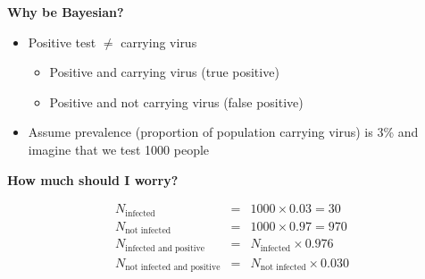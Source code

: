 \documentclass[titlepage,landscape,pdftex]{seminar}
\newcommand{\heading}[1]{{\color{red}\large\bf#1}}
\begin{document}
\begin{slide}
  \heading{Why be Bayesian?}

  \begin{itemize}
    
  \item Positive test $\ne$ carrying virus

    \begin{itemize}

    \item Positive and carrying virus (true positive)

    \item Positive and not carrying virus (false positive)

    \end{itemize}

  \item Assume prevalence (proportion of population carrying virus)
    is 3\% and imagine that we test 1000 people

  \end{itemize}

  \vfill
  
\end{slide}

\begin{slide}
  \heading{How much should I worry?}

  {\small
    \begin{eqnarray*}
      N_{\mbox{infected}} &=& 1000 \times 0.03  = 30 \\
      N_{\mbox{not infected}} & = & 1000 \times 0.97 = 970 \\
      N_{\mbox{infected and positive}} &=& N_{\mbox{infected}}\times
                                           0.976 \\
      N_{\mbox{not infected and positive}} &=&
                                               N_{\mbox{not infected}}\times
                                               0.030
    \end{eqnarray*}
  }

  \vfill

\end{slide}
\end{document}
